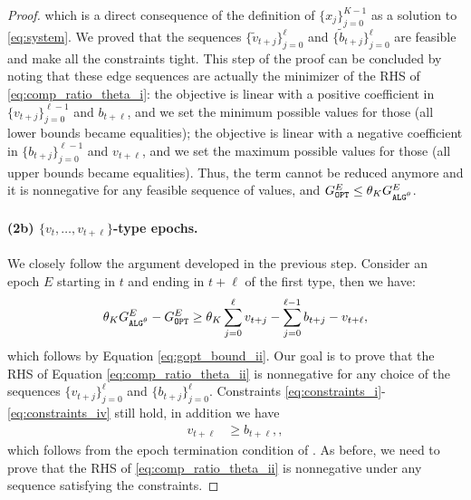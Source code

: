 \begin{proof}
    which is a direct consequence of the definition of $\{x_j\}_{j=0}^{K - 1}$ as a solution to \eqref{eq:system}. We proved that the sequences $\{\widetilde{v}_{t+j}\}_{j=0}^\ell$ and $\{\widetilde{b}_{t+j}\}_{j=0}^\ell$ are feasible and make all the constraints tight. This step of the proof can be concluded by noting that these edge sequences are actually the minimizer of the RHS of \eqref{eq:comp_ratio_theta_i}: the objective is linear with a positive coefficient in $\{v_{t+j}\}_{j=0}^{\ell-1}$ and $b_{t+\ell}$, and we set the minimum possible values for those (all lower bounds became equalities); the objective is linear with a negative coefficient in $\{b_{t+j}\}_{j=0}^{\ell-1}$ and $v_{t+\ell}$, and we set the maximum possible values for those (all upper bounds became equalities). Thus, the term cannot be reduced anymore and it is nonnegative for any feasible sequence of values, and $\Gopt^E\le \theta_K\Galgtheta^E$.
    \paragraph{(2b) $\{v_t, \ldots, v_{t+\ell}\}$-type epochs.} We closely follow the argument developed in the previous step. Consider an epoch $E$ starting in $t$ and ending in $t+\ell$ of the first type, then we have:
    \begin{align}
    \label{eq:comp_ratio_theta_ii}
        \theta_K\Galgtheta^E-\Gopt^E \ge \theta_K\sum_{j=0}^{\ell}v_{t+j} - \sum_{j=0}^{\ell-1} b_{t+j} - v_{t+\ell},
    \end{align}
    which follows by Equation \eqref{eq:gopt_bound_ii}. Our goal is to prove that the RHS of Equation \eqref{eq:comp_ratio_theta_ii} is nonnegative for any choice of the sequences $\{v_{t+j}\}_{j=0}^\ell$ and $\{b_{t+j}\}_{j=0}^\ell$. Constraints \eqref{eq:constraints_i}-\eqref{eq:constraints_iv} still hold, in addition we have
    \begin{align}
        v_{t+\ell} &\ge b_{t+\ell}, \label{eq:constraints_vi},
    \end{align}
    which follows from the epoch termination condition of \algtheta. As before, we need to prove that the RHS of   \eqref{eq:comp_ratio_theta_ii} is nonnegative under any sequence satisfying the constraints.


\end{proof}
